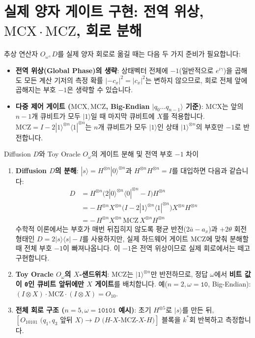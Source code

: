 \documentclass[11pt, a4paper]{article}
\newcommand{\ket}[1]{|#1\rangle}
\newcommand{\bra}[1]{\langle#1|}
\theoremstyle{definition}
\begin{document}
\section{실제 양자 게이트 구현: 전역 위상, \texorpdfstring{$\mathrm{MCX}\cdot\mathrm{MCZ}$}{MCX/MCZ}, 회로 분해}
추상 연산자 $O_\omega, D$를 실제 양자 회로로 옮길 때는 다음 두 가지 준비가 필요합니다:
\begin{itemize}
    \item \textbf{전역 위상(Global Phase)의 생략}: 상태벡터 전체에 $-1$(일반적으로 $e^{i\gamma}$)을 곱해도 모든 계산 기저의 측정 확률 $|-c_x|^2 = |c_x|^2$는 변하지 않으므로, 회로 전체 앞에 곱해지는 부호 $-1$은 생략할 수 있습니다.
    \item \textbf{다중 제어 게이트 ($\mathrm{MCX}, \mathrm{MCZ}$, Big-Endian $\ket{q_0 \dots q_{n-1}}$ 기준)}: $\mathrm{MCX}$는 앞의 $n-1$개 큐비트가 모두 $\ket{1}$일 때 마지막 큐비트에 $X$를 적용합니다. $\mathrm{MCZ} = I - 2\ket{1}^{\otimes n}\bra{1}^{\otimes n}$는 $n$개 큐비트가 모두 $\ket{1}$인 상태 $\ket{1}^{\otimes n}$의 부호만 $-1$로 반전합니다.
\end{itemize}

\begin{notebox}{Diffusion $D$와 Toy Oracle $O_\omega$의 게이트 분해 및 전역 부호 $-1$ 차이}
\begin{enumerate}
    \item \textbf{Diffusion $D$의 분해}: $\ket{s} = H^{\otimes n}\ket{0}^{\otimes n}$과 $H^{\otimes n}H^{\otimes n} = I$를 대입하면 다음과 같습니다:
    \begin{align*}
        D &= H^{\otimes n}\big(2\ket{0}^{\otimes n}\bra{0}^{\otimes n} - I\big)H^{\otimes n} \\
          &= -\,H^{\otimes n} X^{\otimes n}\big(I - 2\ket{1}^{\otimes n}\bra{1}^{\otimes n}\big)X^{\otimes n} H^{\otimes n} \\
          &= -\,H^{\otimes n} X^{\otimes n}\,\mathrm{MCZ}\,X^{\otimes n} H^{\otimes n}
    \end{align*}
    수학적 이론에서는 부호가 매번 뒤집히지 않도록 평균 반전($2\bar{a}-a_x$)과 $+2\theta$ 회전 형태인 $D = 2\ket{s}\bra{s} - I$를 사용하지만, 실제 하드웨어 게이트 $\mathrm{MCZ}$에 맞춰 분해할 때 전체 부호 $-1$이 빠져나옵니다. 이 $-1$은 전역 위상이므로 실제 회로에서는 떼고 구현합니다.
    \item \textbf{Toy Oracle $O_\omega$의 $X$-샌드위치}: $\mathrm{MCZ}$는 $\ket{1}^{\otimes n}$만 반전하므로, 정답 $\omega$에서 \textbf{비트 값이 \texttt{0}인 큐비트 앞뒤에만 $X$ 게이트}를 배치합니다. 예($n=2, \omega=\texttt{10}$, Big-Endian): $(I \otimes X) \cdot \mathrm{MCZ} \cdot (I \otimes X) = O_{10}$.
    \item \textbf{전체 회로 구조 ($n=5, \omega=\texttt{10101}$ 예시)}: 초기 $H^{\otimes 5}$로 $\ket{s}$를 만든 뒤, $[O_{10101}\text{ ($q_1, q_3$ 앞뒤 $X$)} \to D\text{ ($H$-$X$-$\mathrm{MCZ}$-$X$-$H$)}]$ 블록을 $k^*$회 반복하고 측정합니다.
\end{enumerate}
\end{notebox}
\end{document}
